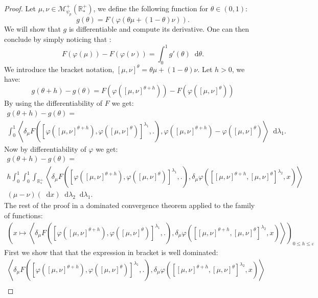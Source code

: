 \documentclass[11pt,a4paper]{article}
\newcommand{\RRP}{\mathbb{R}^+_*}
\newcommand{\MC}{\mathcal{M}}
\newcommand{\brac}[1]{\left\langle#1\right\rangle}
\newcommand{\dd}{\mathop{}\!\mathrm{d}}
\begin{document}
\begin{proof}
    Let $\mu,\nu \in \MC^+_{\psi_p}(\RRP)$, we define the following function for $\theta \in (0,1)$:
    \[
        g(\theta) =  F\left(\varphi(\theta\mu + (1 - \theta)\nu)\right).
    \]
    We will show that $g$ is differentiable and compute its derivative. One can then conclude by simply noticing that :
    \[ F(\varphi(\mu)) - F(\varphi(\nu)) = \int_0^1 g'(\theta) \dd \theta.\]
    We introduce the bracket notation, $[\mu,\nu]^{\theta } =  \theta\mu + (1 - \theta)\nu$. Let $h > 0$, we have:
    \[ 
    g(\theta + h) - g(\theta) = F\left(\varphi\left([\mu,\nu]^{\theta + h}\right)\right) -F\left(\varphi\left([\mu,\nu]^{\theta}\right)\right)
    \]
    By using the differentiability of $F$ we get:
    \begin{multline*}
    g(\theta + h) - g(\theta) =\\ \int_0^1 \brac{\delta_\mu F\left(\left[\varphi\left([\mu,\nu]^{\theta + h}\right),\varphi\left([\mu,\nu]^{\theta}\right)\right]^{\lambda_1}, . \right),\varphi\left([\mu,\nu]^{\theta + h}\right) - \varphi\left([\mu,\nu]^{\theta}\right)} \dd \lambda_1.
    \end{multline*}
    Now by differentiability of $\varphi$ we get:
    \begin{multline*}
        g(\theta + h) - g(\theta) =\\
        h\int_0^1 \int_0^1\int_{\RRP} \brac{\delta_\mu F\left(\left[\varphi\left([\mu,\nu]^{\theta + h}\right),\varphi\left([\mu,\nu]^{\theta}\right)\right]^{\lambda_1}, . \right),\delta_\mu \varphi\left(\left[ [\mu,\nu]^{\theta + h}, [\mu,\nu]^{\theta }\right]^{\lambda_2} ,x\right)}
        \\
        (\mu-\nu)(\dd x) \dd \lambda_2 \dd \lambda_1. 
    \end{multline*}
    The rest of the proof in a dominated convergence theorem applied to the family of functions:
    \begin{align*}
        \left(x \mapsto \brac{\delta_\mu F\left(\left[\varphi\left([\mu,\nu]^{\theta + h}\right),\varphi\left([\mu,\nu]^{\theta}\right)\right]^{\lambda_1}, . \right),\delta_\mu \varphi\left(\left[ [\mu,\nu]^{\theta + h}, [\mu,\nu]^{\theta }\right]^{\lambda_2} ,x\right)} \right)_{0 \leq h \leq \varepsilon}
    \end{align*}
    First we show that that the expression in bracket is well dominated:
    \begin{multline*}
        \brac{\delta_\mu F\left(\left[\varphi\left([\mu,\nu]^{\theta + h}\right),\varphi\left([\mu,\nu]^{\theta}\right)\right]^{\lambda_1}, . \right),\delta_\mu \varphi\left(\left[ [\mu,\nu]^{\theta + h}, [\mu,\nu]^{\theta }\right]^{\lambda_2} ,x\right)} \\

\end{multline*}
\end{proof}
\end{document}
